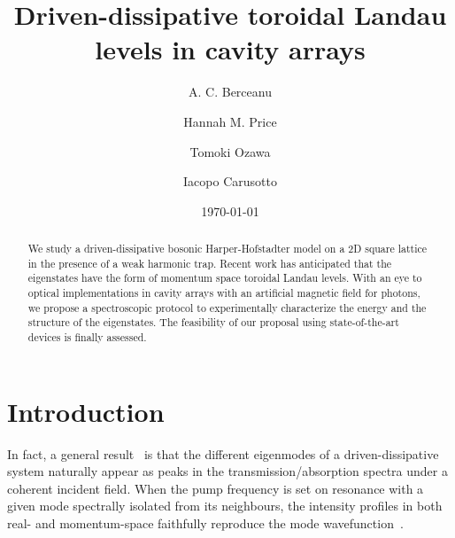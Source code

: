 \documentclass[twocolumn, 10pt, aps, superscriptaddress, floatfix, showpacs, pra, citeautoscript]{revtex4-1}
\begin{document}
\title{Driven-dissipative toroidal Landau levels in cavity arrays}


\author{A. C. Berceanu}
\author{Hannah M. Price}
\author{Tomoki Ozawa}
\author{Iacopo Carusotto}

\date{\today}

\begin{abstract}
  We study a driven-dissipative bosonic Harper-Hofstadter model on a
  2D square lattice in the presence of a weak harmonic trap. Recent
  work has anticipated that the eigenstates have the form of momentum
  space toroidal Landau levels. With an eye to optical implementations
  in cavity arrays with an artificial magnetic field for photons, we
  propose a spectroscopic protocol to experimentally characterize the
  energy and the structure of the eigenstates. The feasibility of our
  proposal using state-of-the-art devices is finally assessed.
\end{abstract}

\maketitle


\section{Introduction}
In fact, a general result~\cite{carusotto2013fluids} is that the different eigenmodes
of a driven-dissipative system naturally appear as peaks in the
transmission/absorption spectra under a coherent incident field. When
the pump frequency is set on resonance with a given mode spectrally
isolated from its neighbours, the intensity profiles in both real- and
momentum-space faithfully reproduce the mode wavefunction~\cite{carusotto2013fluids}.
\end{document}
